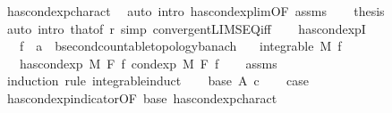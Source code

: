 \begin{isabellebody}
\ has{\isacharunderscore}{\kern0pt}cond{\isacharunderscore}{\kern0pt}exp{\isacharunderscore}{\kern0pt}charact{\isacharparenleft}{\kern0pt}{}{\isacharparenright}{\kern0pt}\ \isamarkupfalse%
\ {\isacharparenleft}{\kern0pt}auto\ intro{\isacharcolon}{\kern0pt}\ has{\isacharunderscore}{\kern0pt}cond{\isacharunderscore}{\kern0pt}exp{\isacharunderscore}{\kern0pt}lim{\isacharbrackleft}{\kern0pt}OF\ assms{\isacharbrackright}{\kern0pt}{\isacharparenright}{\kern0pt}\isanewline
\ \ \isamarkupfalse%
\ {\isacharquery}{\kern0pt}thesis\ \isamarkupfalse%
\ {\isacharparenleft}{\kern0pt}auto\ intro{\isacharbang}{\kern0pt}{\isacharcolon}{\kern0pt}\ that{\isacharbrackleft}{\kern0pt}of\ r{\isacharbrackright}{\kern0pt}\ simp{\isacharcolon}{\kern0pt}\ convergent{\isacharunderscore}{\kern0pt}LIMSEQ{\isacharunderscore}{\kern0pt}iff{\isacharparenright}{\kern0pt}\isanewline
{}\isamarkupfalse%
%
\endisatagproof
{\isafoldproof}%
%
\isadelimproof
\isanewline
%
\endisadelimproof
\ \ \isanewline
{}\isamarkupfalse%
\ has{\isacharunderscore}{\kern0pt}cond{\isacharunderscore}{\kern0pt}expI{\isacharcolon}{\kern0pt}\isanewline
\ \ \ f\ {\isacharcolon}{\kern0pt}{\isacharcolon}{\kern0pt}\ {\isachardoublequoteopen}{\isacharprime}{\kern0pt}a\ {\isasymRightarrow}\ {\isacharprime}{\kern0pt}b{\isacharcolon}{\kern0pt}{\isacharcolon}{\kern0pt}{\isacharbraceleft}{\kern0pt}second{\isacharunderscore}{\kern0pt}countable{\isacharunderscore}{\kern0pt}topology{\isacharcomma}{\kern0pt}banach{\isacharbraceright}{\kern0pt}{\isachardoublequoteclose}\isanewline
\ \ \ {\isachardoublequoteopen}integrable\ M\ f{\isachardoublequoteclose}\isanewline
\ \ \ {\isachardoublequoteopen}has{\isacharunderscore}{\kern0pt}cond{\isacharunderscore}{\kern0pt}exp\ M\ F\ f\ {\isacharparenleft}{\kern0pt}cond{\isacharunderscore}{\kern0pt}exp\ M\ F\ f{\isacharparenright}{\kern0pt}{\isachardoublequoteclose}\isanewline
%
\isadelimproof
\ \ %
\endisadelimproof
%
\isatagproof
{}\isamarkupfalse%
\ assms\isanewline
{}\isamarkupfalse%
\ {\isacharparenleft}{\kern0pt}induction\ rule{\isacharcolon}{\kern0pt}\ integrable{\isacharunderscore}{\kern0pt}induct{\isacharprime}{\kern0pt}{\isacharparenright}{\kern0pt}\isanewline
\ \ \isamarkupfalse%
\ {\isacharparenleft}{\kern0pt}base\ A\ c{\isacharparenright}{\kern0pt}\isanewline
\ \ \isamarkupfalse%
\ {\isacharquery}{\kern0pt}case\ \isamarkupfalse%
\ has{\isacharunderscore}{\kern0pt}cond{\isacharunderscore}{\kern0pt}exp{\isacharunderscore}{\kern0pt}indicator{\isacharbrackleft}{\kern0pt}OF\ base{\isacharparenleft}{\kern0pt}{}{\isacharcomma}{\kern0pt}{}{\isacharparenright}{\kern0pt}{\isacharbrackright}{\kern0pt}\ has{\isacharunderscore}{\kern0pt}cond{\isacharunderscore}{\kern0pt}exp{\isacharunderscore}{\kern0pt}charact{\isacharparenleft}{\kern0pt}{}{\isacharparenright}{\kern0pt}\ \isamarkupfalse%

\end{isabellebody}
